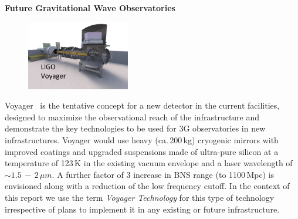 \begin{DetBox}{\bf Future Gravitational Wave Observatories}
\begin{tcolorbox}[standard jigsaw,colframe=azure!70!black,colback=azure!20!white,opacityback=0.6,coltext=black, size=small, title=Voyager]
\begin{figure}
\vspace{-10pt}
\includegraphics*[width=0.4\textwidth]{Figures/Voyager_Thumb.jpg}
\label{fig:Voyager_Thumb}
\vspace{-20pt}
\end{figure}

Voyager~\cite{Voyager:Inst,VoyagerDCC2018, VoyagerDCC2019} is the tentative concept for a new detector in the current facilities, designed to maximize the observational reach of the infrastructure and demonstrate the key technologies to be used for 3G observatories in new infrastructures.
Voyager would use heavy (ca.\,200\,kg) cryogenic mirrors with improved coatings and upgraded suspensions made of ultra-pure silicon at a temperature of 123\,K in the existing vacuum envelope and a laser wavelength of $\sim1.5\,-\,2\,\mu m$. 
A further factor of 3 increase in BNS range (to 1100\,Mpc) is envisioned along with a reduction of the low frequency cutoff. %
In the context of this report we use the term \emph{Voyager Technology} for this type of technology irrespective of plans to implement it in any existing or future infrastructure.
\end{tcolorbox}

\end{DetBox}
\newpage 


